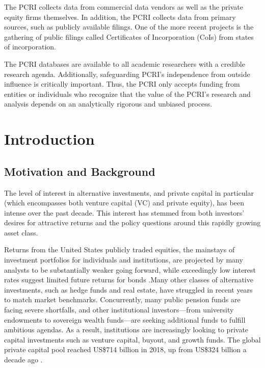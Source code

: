 The PCRI collects data from commercial data vendors as well as the private equity firms themselves. In addition, the PCRI collects data from primary sources, such as publicly available filings. One of the more recent projects is the gathering of public filings called Certificates of Incorporation (CoIs) from states of incorporation.

The PCRI databases are available to all academic researchers with a credible research agenda. Additionally, safeguarding PCRI's independence from outside influence is critically important. Thus, the PCRI only accepts funding from entities or individuals who recognize that the value of the PCRI's research and analysis depends on an analytically rigorous and unbiased process.

\hypertarget{introduction-4}{%
\section{Introduction}\label{introduction-4}}

\hypertarget{motivation-and-background-2}{%
\subsection{Motivation and Background}\label{motivation-and-background-2}}

The level of interest in alternative investments, and private capital in particular (which encompasses both venture capital (VC) and private equity), has been intense over the past decade. This interest has stemmed from both investors' desires for attractive returns and the policy questions around this rapidly growing asset class.

Returns from the United States publicly traded equities, the mainstays of investment portfolios for individuals and institutions, are projected by many analysts to be substantially weaker going forward, while exceedingly low interest rates suggest limited future returns for bonds \citep{perianan2020}.Many other classes of alternative investments, such as hedge funds and real estate, have struggled in recent years to match market benchmarks. Concurrently, many public pension funds are facing severe shortfalls, and other institutional investors---from university endowments to sovereign wealth funds---are seeking additional funds to fulfill ambitious agendas. As a result, institutions are increasingly looking to private capital investments such as venture capital, buyout, and growth funds. The global private capital pool reached US\$714 billion in 2018, up from US\$324 billion a decade ago \citep{baincompany2019}.

